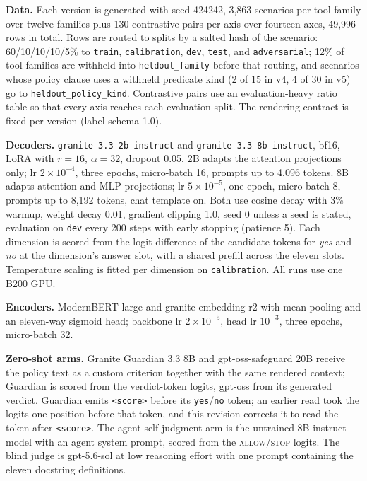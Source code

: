 \textbf{Data.} Each version is generated with seed 424242, 3,863 scenarios
per tool family over twelve families plus 130 contrastive pairs per axis over
fourteen axes, 49,996 rows in total. Rows are routed to splits by a salted
hash of the scenario: 60/10/10/10/5\% to \texttt{train}, \texttt{calibration},
\texttt{dev}, \texttt{test}, and \texttt{adversarial}; 12\% of tool families
are withheld into \texttt{heldout\_family} before that routing, and scenarios
whose policy clause uses a withheld predicate kind (2 of 15 in v4, 4 of 30 in
v5) go to \texttt{heldout\_policy\_kind}. Contrastive pairs use an
evaluation-heavy ratio table so that every axis reaches each evaluation
split. The rendering contract is fixed per version (label schema 1.0).

\textbf{Decoders.} \texttt{granite-3.3-2b-instruct} and
\texttt{granite-3.3-8b-instruct}, bf16, LoRA \citep{hu2021lora} with
$r{=}16$, $\alpha{=}32$, dropout 0.05. 2B adapts the attention projections
only; lr $2{\times}10^{-4}$, three epochs, micro-batch 16, prompts up to 4,096
tokens. 8B adapts attention and MLP projections; lr $5{\times}10^{-5}$, one
epoch, micro-batch 8, prompts up to 8,192 tokens, chat template on. Both use
cosine decay with 3\% warmup, weight decay 0.01, gradient clipping 1.0, seed 0
unless a seed is stated, evaluation on \texttt{dev} every 200 steps with
early stopping (patience 5). Each dimension is scored from the logit
difference of the candidate tokens for \emph{yes} and \emph{no} at the
dimension's answer slot, with a shared prefill across the eleven slots.
Temperature scaling is fitted per dimension on \texttt{calibration}. All runs
use one B200 GPU.

\textbf{Encoders.} ModernBERT-large \citep{warner2024modernbert} and
granite-embedding-r2 with mean pooling and an eleven-way sigmoid head;
backbone lr $2{\times}10^{-5}$, head lr $10^{-3}$, three epochs, micro-batch
32.

\textbf{Zero-shot arms.} Granite Guardian 3.3 8B and gpt-oss-safeguard 20B
receive the policy text as a custom criterion together with the same
rendered context; Guardian is scored from the verdict-token logits, gpt-oss
from its generated verdict. Guardian emits \texttt{<score>} before its
\texttt{yes}/\texttt{no} token; an earlier read took the logits one position
before that token, and this revision corrects it to read the token after
\texttt{<score>}. The agent self-judgment arm is the untrained 8B
instruct model with an agent system prompt, scored from the
\textsc{allow}/\textsc{stop} logits. The blind judge is gpt-5.6-sol at low
reasoning effort with one prompt containing the eleven docstring definitions.
\FloatBarrier

